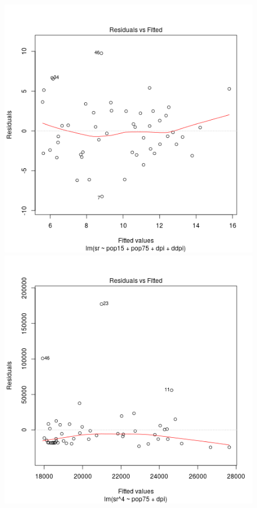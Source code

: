 \begin{figure}[p]
  \begin{center}
    \includegraphics[scale=0.4]{plot11.png} \hspace*{2cm} \includegraphics[scale=0.4]{plot21.png} \\

\end{center}
\end{figure}

